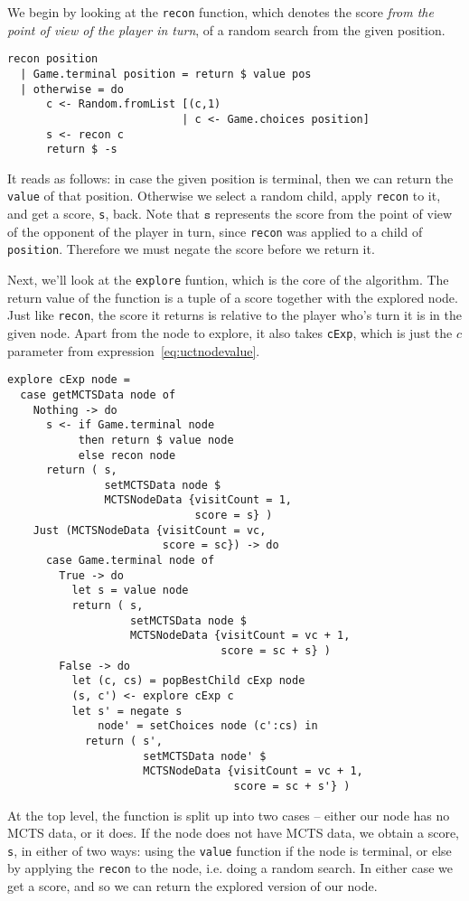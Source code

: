 We begin by looking at the \texttt{recon} function, which denotes the score \emph{from the point of view of the player in turn}, of a random search from the given position.
\begin{lstlisting}[frame=single]
recon position
  | Game.terminal position = return $ value pos
  | otherwise = do
      c <- Random.fromList [(c,1)
                           | c <- Game.choices position]
      s <- recon c
      return $ -s
\end{lstlisting}
It reads as follows: in case the given position is terminal, then we can return the \texttt{value} of that position. Otherwise we select a random child, apply \texttt{recon} to it, and get a score, \texttt{s}, back.
Note that $\texttt{s}$ represents the score from the point of view of the opponent of the player in turn, since \texttt{recon} was applied to a child of \texttt{position}. Therefore we must negate the score before we return it.

Next, we'll look at the \texttt{explore} funtion, which is the core of the algorithm. The return value of the function is a tuple of a score together with the explored node. Just like \texttt{recon}, the score it returns is relative to the player who's turn it is in the given node. Apart from the node to explore, it also takes \texttt{cExp}, which is just the $c$ parameter from expression~\ref{eq:uctnodevalue}.
\begin{lstlisting}[frame=single]
explore cExp node = 
  case getMCTSData node of
    Nothing -> do
      s <- if Game.terminal node
           then return $ value node
           else recon node
      return ( s,
               setMCTSData node $
               MCTSNodeData {visitCount = 1,
                             score = s} )
    Just (MCTSNodeData {visitCount = vc,
                        score = sc}) -> do
      case Game.terminal node of
        True -> do
          let s = value node
          return ( s,
                   setMCTSData node $
                   MCTSNodeData {visitCount = vc + 1,
                                 score = sc + s} )
        False -> do
          let (c, cs) = popBestChild cExp node
          (s, c') <- explore cExp c
          let s' = negate s
              node' = setChoices node (c':cs) in
            return ( s',
                     setMCTSData node' $
                     MCTSNodeData {visitCount = vc + 1,
                                   score = sc + s'} )
\end{lstlisting}
At the top level, the function is split up into two cases -- either our node has no MCTS data, or it does.
If the node does not have MCTS data, we obtain a score, \texttt{s}, in either of two ways: using the \texttt{value} function if the node is terminal, or else by applying the \texttt{recon} to the node, i.e. doing a random search.
In either case we get a score, and so we can return the explored version of our node.


